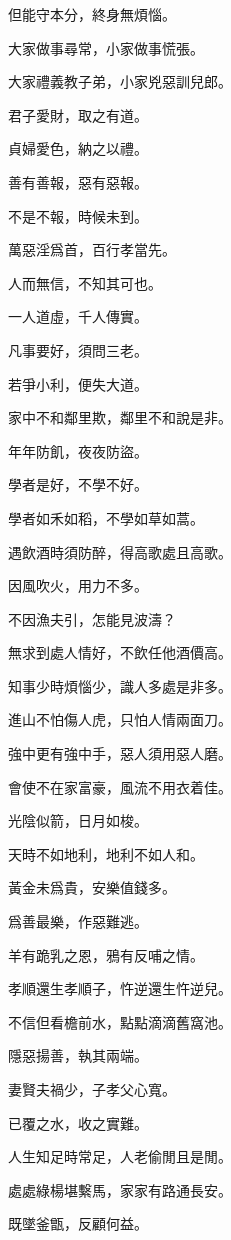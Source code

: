 \documentclass[12pt,a4paper]{ctexbook}
\begin{document}
但能守本分，終身無煩惱。\par
大家做事尋常，小家做事慌張。\par
大家禮義教子弟，小家兇惡訓兒郎。\par
君子愛財，取之有道。\par
貞婦愛色，納之以禮。\par
善有善報，惡有惡報。\par
不是不報，時候未到。\par
萬惡淫爲首，百行孝當先。\par
人而無信，不知其可也。\par
一人道虛，千人傳實。\par
凡事要好，須問三老。\par
若爭小利，便失大道。\par
家中不和鄰里欺，鄰里不和說是非。\par
年年防飢，夜夜防盜。\par
學者是好，不學不好。\par
學者如禾如稻，不學如草如蒿。\par
遇飲酒時須防醉，得高歌處且高歌。\par
因風吹火，用力不多。\par
不因漁夫引，怎能見波濤？\par
無求到處人情好，不飲任他酒價高。\par
知事少時煩惱少，識人多處是非多。\par
進山不怕傷人虎，只怕人情兩面刀。\par
強中更有強中手，惡人須用惡人磨。\par
會使不在家富豪，風流不用衣着佳。\par
光陰似箭，日月如梭。\par
天時不如地利，地利不如人和。\par
黃金未爲貴，安樂值錢多。\par
爲善最樂，作惡難逃。\par
羊有跪乳之恩，鴉有反哺之情。\par
孝順還生孝順子，忤逆還生忤逆兒。\par
不信但看檐前水，點點滴滴舊窩池。\par
隱惡揚善，執其兩端。\par
妻賢夫禍少，子孝父心寬。\par
已覆之水，收之實難。\par
人生知足時常足，人老偷閒且是閒。\par
處處綠楊堪繫馬，家家有路通長安。\par
既墜釜甑，反顧何益。\par
\end{document}
